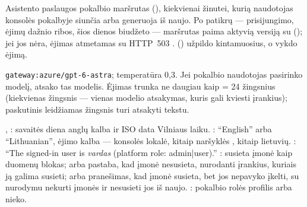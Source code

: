  Asistento paslaugos pokalbio maršrutas
 (), kiekvienai žinutei, kurią naudotojas
konsolės pokalbyje siunčia arba generuoja iš naujo. Po patikrų --- prisijungimo, ėjimų dažnio
ribos, šios dienos biudžeto --- maršrutas paima aktyvią versiją su 
(); jei jos nėra, ėjimas atmetamas su HTTP~503
.  () užpildo
kintamuosius, o  vykdo ėjimą.

 \texttt{gateway:azure/gpt-6-astra}; temperatūra 0,3. Jei
pokalbio naudotojas pasirinko modelį, atsako tas modelis. Ėjimas trunka ne daugiau kaip
 = 24 žingsnius (kiekvienas žingsnis --- vienas modelio atsakymas, kuris gali
kviesti įrankius); paskutinis leidžiamas žingsnis turi atsakyti tekstu.

 , : savaitės diena anglų kalba ir ISO
data Vilniaus laiku. : \enquote{English} arba \enquote{Lithuanian},
ėjimo kalba --- konsolės lokalė, kitaip naršyklės , kitaip lietuvių.
: \enquote{The signed-in user is \textit{vardas} (platform role:
admin|user).} : susieta įmonė kaip duomenų blokas; arba pastaba, kad
įmonė nesusieta, nurodanti įrankius, kuriais ją galima susieti; arba pranešimas, kad įmonė
susieta, bet jos nepavyko įkelti, su nurodymu nekurti įmonės ir nesusieti jos iš naujo.
: pokalbio rolės profilis arba nieko.

